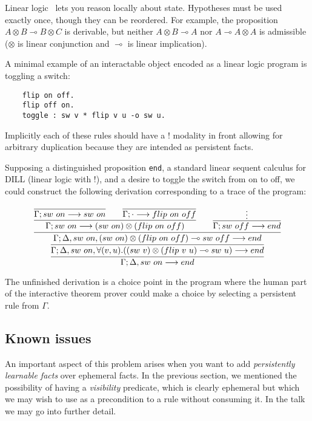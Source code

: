 \newcommand{\lolli}{\multimap}

Linear logic~\cite{Girard87} lets you reason locally about state. Hypotheses must be used
exactly once, though they can be reordered. For example, the proposition $A
\otimes B \lolli B \otimes C$ is derivable, but neither $A \otimes B \lolli
A$ nor $A \lolli A \otimes A$ is admissible ($\otimes$ is linear
conjunction and $\lolli$ is linear implication).

A minimal example of an interactable object encoded as a linear logic
program is toggling a switch:

\begin{verbatim}
    flip on off.
    flip off on.
    toggle : sw v * flip v u -o sw u.
\end{verbatim}

Implicitly each of these rules should have a $!$ modality in front allowing
for arbitrary duplication because they are intended as persistent facts.

Supposing a distinguished proposition \verb|end|, a standard linear sequent
calculus for DILL (linear logic with $!$), and a desire to toggle the
switch from on to off, we could construct the following derivation
corresponding to a trace of the program:

\small{
\[
\infer
{
  \Gamma; \Delta, sw\ on \longrightarrow end
}
{
  \infer
  {
    \Gamma; \Delta, sw\ on, \forall(v,u).((sw\ v)\otimes (flip\ v\
    u)\multimap sw\ u)
    \longrightarrow end
  }
  {
  \infer
    {
    \Gamma; \Delta, sw\ on, (sw\ on)\otimes (flip\ on\ off)\multimap sw\
    off
    \longrightarrow end
    }
    {
        \infer{
          \Gamma; sw\ on \longrightarrow (sw\ on)\otimes(flip\ on\ off)
          }
          {
            \infer
            {\Gamma; sw\ on \longrightarrow sw\ on}
            {}
            \qquad
            \infer
            {\Gamma; \cdot \longrightarrow flip\ on\ off}
            {}
          }
        \qquad
        \infer{
          \Gamma; sw\ off \longrightarrow end
          }
          {\vdots
          }
    }
  }
}
\]
}

The unfinished derivation is a choice point in the program where the human
part of the interactive theorem prover could make a choice by selecting a
persistent rule from $\Gamma$. 

\subsection{Known issues}

An important aspect of this problem arises when you want to add {\em
persistently learnable facts} over ephemeral facts. In the previous
section, we mentioned the possibility of having a {\em visibility}
predicate, which is clearly ephemeral but which we may wish to use as a
precondition to a rule without consuming it. In the talk we may go into
further detail.
